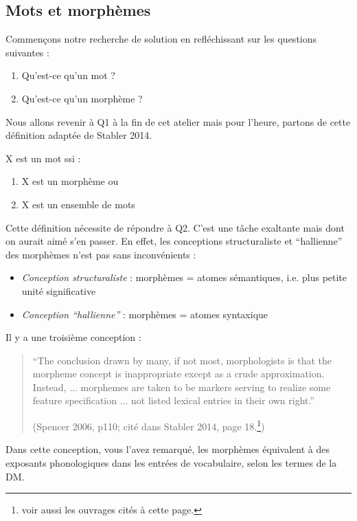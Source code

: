     \subsection{Mots et morph\`emes}
      Commen\c cons notre recherche de solution en refl\'echissant sur les questions suivantes : 
      \begin{enumerate}
      	\item[Q1 :] Qu'est-ce qu'un mot ?
      	\item[Q2 :] Qu'est-ce qu'un morph\`eme ?  
      \end{enumerate}
      Nous allons revenir \`a Q1 \`a la fin de cet atelier mais pour l'heure, partons de cette d\'efinition adapt\'ee de Stabler 2014.
      \begin{defin}[Mot]
        X est un mot ssi :
        \begin{enumerate}
      	  \item X est un morph\`eme ou
      	  \item X est un ensemble de mots
        \end{enumerate}
      \end{defin}
      Cette d\'efinition n\'ecessite de r\'epondre \`a Q2. C'est une t\^ache exaltante mais dont on aurait aim\'e s'en passer. En effet, les conceptions structuraliste et ``hallienne'' des morph\`emes n'est pas sans inconv\'enients :
      \begin{itemize}
      	\item \textit{Conception structuraliste} : morph\`emes = atomes s\'emantiques, i.e. plus petite unit\'e significative
      	\item \textit{Conception ``hallienne''} : morph\`emes = atomes syntaxique 
      \end{itemize} 
      Il y a une troisi\`eme conception :
      \begin{quote}
      	``The conclusion drawn by many, if 
      	not most, morphologists is that the
      	morpheme concept is inappropriate except
      	as a crude approximation. Instead, ... morphemes are taken to be
      	markers serving to realize some feature
      	specification ... not listed lexical entries
      	in their own right.'' 
      	
      	(Spencer 2006,
      	p110; cit\'e dans Stabler 2014, page 18.\footnote{voir aussi les ouvrages cit\'es \`a cette page.})
      \end{quote}
      Dans cette conception, vous l'avez remarqu\'e, les morph\`emes \'equivalent \`a des exposants phonologiques dans les entr\'ees de vocabulaire, selon les termes de la DM.
